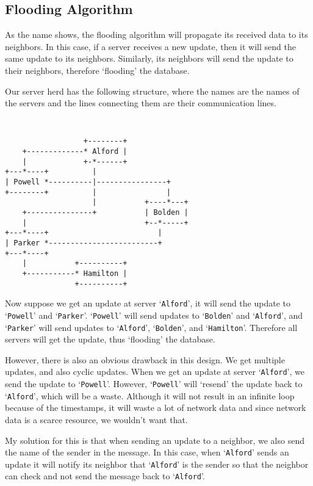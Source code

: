 \documentclass[letterpaper,twocolumn,10pt]{article}
\begin{document}
\subsection{Flooding Algorithm}

As the name shows, the flooding algorithm will propagate its received data to its neighbors. In this case, if a server receives a new update, then it will send the same update to its neighbors. Similarly, its neighbors will send the update to their neighbors, therefore `flooding' the database.

Our server herd has the following structure, where the names are the names of the servers and the lines connecting them are their communication lines.

{\tt \small
\begin{verbatim}
                  +--------+
    +-------------* Alford |
    |             +-*------+
+---*----+          |
| Powell *----------|----------------+
+--------+          |                |
                    |           +----*---+
    +---------------+           | Bolden |
    |                           +--*-----+
+---*----+                         |
| Parker *-------------------------+
+---*----+
    |           +----------+
    +-----------* Hamilton |
                +----------+

\end{verbatim}
}

\noindent
Now suppose we get an update at server `{\tt Alford}', it will send the update to `{\tt Powell}' and `{\tt Parker}'. `{\tt Powell}' will send updates to `{\tt Bolden}' and `{\tt Alford}', and `{\tt Parker}' will send updates to `{\tt Alford}', `{\tt Bolden}', and `{\tt Hamilton}'. Therefore all servers will get the update, thus `flooding' the database.

However, there is also an obvious drawback in this design. We get multiple updates, and also cyclic updates. When we get an update at server `{\tt Alford}', we send the update to `{\tt Powell}'. However, `{\tt Powell}' will `resend' the update back to `{\tt Alford}', which will be a waste. Although it will not result in an infinite loop because of the timestamps, it will waste a lot of network data and since network data is a scarce resource, we wouldn't want that.

My solution for this is that when sending an update to a neighbor, we also send the name of the sender in the message. In this case, when `{\tt Alford}' sends an update it will notify its neighbor that `{\tt Alford}' is the sender so that the neighbor can check and not send the message back to `{\tt Alford}'.
\end{document}
